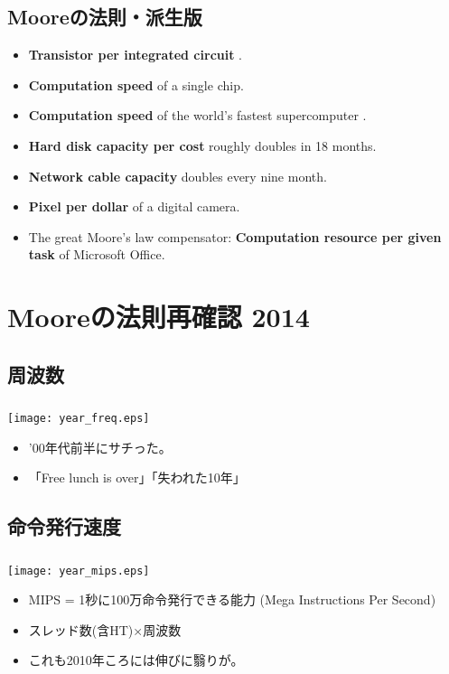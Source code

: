 \documentclass{beamer}  %
\theoremstyle{example}
\begin{document}
\subsection{Mooreの法則・派生版}
\begin{frame}
\begin{itemize}\frametitle{\insertsubsection}
\item {\bf Transistor per integrated circuit} .
\item {\bf Computation speed} of a single chip.
\item {\bf Computation speed} of the world's fastest supercomputer .
\item {\bf Hard disk capacity per cost} roughly doubles in 18 months.
\item {\bf Network cable capacity} doubles every nine month.
\item {\bf Pixel per dollar} of a digital camera.
\item The great Moore's law compensator: {\bf Computation resource per given task} of Microsoft Office.

\end{itemize} 
\end{frame}

\section{Mooreの法則再確認 2014}             %

\subsection{周波数} 
\begin{frame}\frametitle{\insertsubsection}
\begin{center}
\texttt{[image: year\_freq.eps]}
\end{center}
\pause
\begin{itemize}
\item '00年代前半にサチった。\pause
\item 「Free lunch is over」\pause「失われた10年」
\end{itemize}
\end{frame}


\subsection{命令発行速度}       
\begin{frame}\frametitle{\insertsubsection}
\begin{center}
\texttt{[image: year\_mips.eps]}
\end{center}
\pause
\begin{itemize}
\item MIPS = 1秒に100万命令発行できる能力 (Mega Instructions Per Second) \pause
\item スレッド数(含HT)×周波数 \pause 
\item これも2010年ころには伸びに翳りが。
\end{itemize}
\end{frame}
\end{document}
